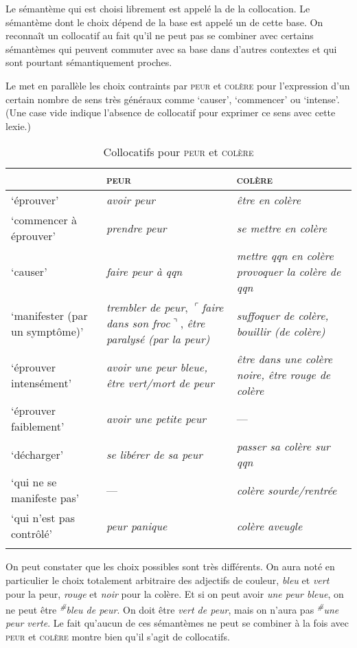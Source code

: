 {Le sémantème qui est choisi librement est appelé la  de la collocation. Le sémantème dont le choix dépend de la base est appelé un  de cette base. On reconnaît un collocatif au fait qu’il ne peut pas se combiner avec certains sémantèmes qui peuvent commuter avec sa base dans d’autres contextes et qui sont pourtant sémantiquement proches.}\largerpage[-1]

Le  met en parallèle les choix contraints par \textsc{peur} et \textsc{colère} pour l’expression d’un certain nombre de sens très généraux comme ‘causer’, ‘commencer’ ou ‘intense’. (Une case vide indique l’absence de collocatif pour exprimer ce sens avec cette lexie.)

\begin{table}
\caption{Collocatifs pour \textsc{peur} et \textsc{colère}\label{tab:2-3:1}}
\begin{tabularx}{\textwidth}{QQQ}
\lsptoprule
 & {\scshape peur} & {\scshape colère}\\
 \midrule
‘éprouver’ & {\itshape avoir peur} & {\itshape être en colère}\\
‘commencer à éprouver’ & {\itshape prendre peur} & {\itshape se mettre en colère}\\
‘causer’ & {\itshape faire peur à qqn} & {\itshape mettre qqn en colère} {\itshape provoquer la colère de qqn}\\
‘manifester (par un symptôme)’ & \textit{trembler de peur}, $⌜$\textit{faire dans son froc}$⌝$, {\itshape être paralysé (par la peur)} & {\itshape suffoquer de colère, bouillir (de colère)}\\
‘éprouver intensément’ & {\itshape avoir une peur bleue, être vert/mort de peur} & {\itshape être dans une colère noire, être rouge de colère}\\
‘éprouver faiblement’ & {\itshape avoir une petite peur} & --- \\
‘décharger’ & {\itshape se libérer de sa peur} & {\itshape passer sa colère sur qqn}\\
‘qui ne se manifeste pas’ & --- & {\itshape colère sourde/rentrée}\\
‘qui n’est pas contrôlé’ & {\itshape peur panique} & {\itshape colère aveugle}\\
\lspbottomrule
\end{tabularx}
\end{table}

On peut constater que les choix possibles sont très différents. On aura noté en particulier le choix totalement arbitraire des adjectifs de couleur, \textit{bleu} et \textit{vert} pour la peur, \textit{rouge} et \textit{noir} pour la colère. Et si on peut avoir \textit{une peur bleue}, on ne peut être \textit{\textsuperscript{\#}}\textit{bleu de peur}. On doit être \textit{vert de peur}, mais on n’aura pas \textit{\textsuperscript{\#}}\textit{une peur verte}. Le fait qu’aucun de ces sémantèmes ne peut se combiner à la fois avec \textsc{peur} et \textsc{colère} montre bien qu’il s’agit de collocatifs.

